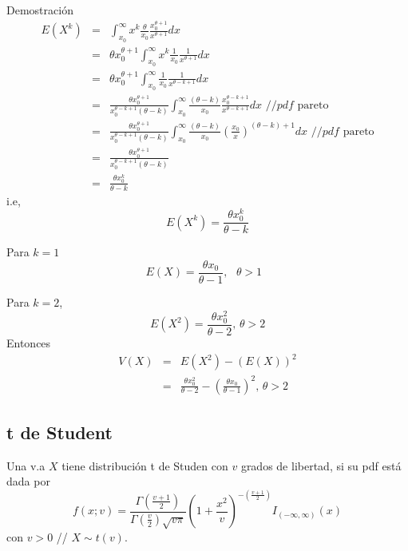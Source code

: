 \begin{i}
Demostración
\begin{eqnarray*}
E(X^{k}) &=&\int_{x_{0}}^{\infty }x^{k}\frac{\theta }{x_{0}}\frac{
x_{0}^{\theta +1}}{x^{\theta +1}}dx \\
&=&\theta x_{0}^{\theta +1}\int_{x_{0}}^{\infty }x^{k}\frac{1}{x_{0}}\frac{1
}{x^{\theta +1}}dx \\
&=&\theta x_{0}^{\theta +1}\int_{x_{0}}^{\infty }\frac{1}{x_{0}}\frac{1}{
x^{\theta -k+1}}dx \\
&=&\frac{\theta x_{0}^{\theta +1}}{x_{0}^{\theta -k+1}(\theta -k)}
\int_{x_{0}}^{\infty }\frac{(\theta -k)}{x_{0}}\frac{x_{0}^{\theta -k+1}}{
x^{\theta -k+1}}dx\text{ //}pdf\text{ pareto} \\
&=&\frac{\theta x_{0}^{\theta +1}}{x_{0}^{\theta -k+1}(\theta -k)}
\int_{x_{0}}^{\infty }\frac{(\theta -k)}{x_{0}}\left( \frac{x_{0}}{x}\right)
^{(\theta -k)+1}dx\text{ //}pdf\text{ pareto} \\
&=&\frac{\theta x_{0}^{\theta +1}}{x_{0}^{\theta -k+1}(\theta -k)} \\
&=&\frac{\theta x_{0}^{k}}{\theta -k}
\end{eqnarray*}%
i.e,
\begin{equation*}
E(X^{k})=\frac{\theta x_{0}^{k}}{\theta -k}
\end{equation*}

Para $k=1$
\begin{equation*}
E(X)=\frac{\theta x_{0}}{\theta -1},\text{ }\theta >1\text{\ }
\end{equation*}

Para $k=2$,
\begin{equation*}
E(X^{2})=\frac{\theta x_{0}^{2}}{\theta -2}\text{, }\theta >2
\end{equation*}%
Entonces
\begin{eqnarray*}
V(X) &=&E(X^{2})-(E(X))^{2} \\
&=&\frac{\theta x_{0}^{2}}{\theta -2}-\left( \frac{\theta x_{0}}{\theta -1}
\right) ^{2}\text{, \ }\theta >2
\end{eqnarray*}

\subsection{t de Student}

\begin{definition}
Una v.a $X$ tiene distribución t de Studen con $v$ grados de libertad, si su pdf está dada por
\begin{equation*}
f(x;v)=\frac{\Gamma \left( \frac{v+1}{2}\right) }{\Gamma \left( \frac{v}{2}
\right) \sqrt{v\pi }}\left( 1+\frac{x^{2}}{v}\right) ^{-\left( \frac{v+1}{2}
\right) }I_{(-\infty ,\infty )}(x)
\end{equation*}%
con $v>0$ // $X\sim t(v)$.
\end{definition}


\end{i}
